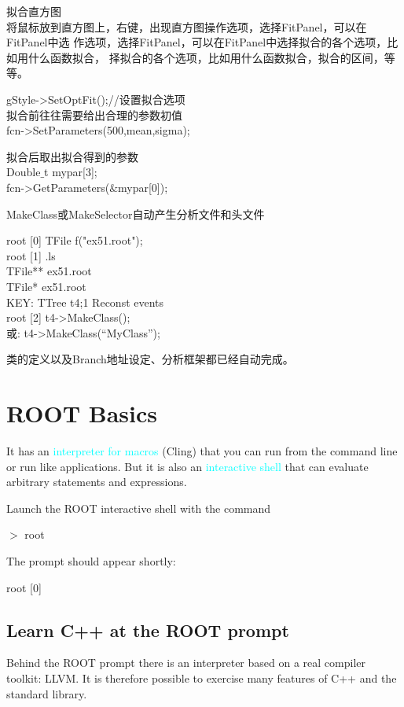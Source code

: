 \documentclass[12pt,a4paper]{article}
\begin{document}
拟合直方图 \\
将鼠标放到直方图上，右键，出现直方图操作选项，选择FitPanel，可以在FitPanel中选 作选项，选择FitPanel，可以在FitPanel中选择拟合的各个选项，比如用什么函数拟合， 择拟合的各个选项，比如用什么函数拟合，拟合的区间，等等。

gStyle->SetOptFit();//设置拟合选项 \\
拟合前往往需要给出合理的参数初值 \\
fcn->SetParameters(500,mean,sigma);

拟合后取出拟合得到的参数 \\
Double$\_$t mypar[3]; \\
fcn->GetParameters($\&$mypar[0]);


MakeClass或MakeSelector自动产生分析文件和头文件

root [0] TFile f("ex51.root"); \\
root [1] .ls \\
TFile** ex51.root \\
TFile*  ex51.root \\
KEY: TTree t4;1 Reconst events \\
root [2] t4->MakeClass(); \\
或: t4->MakeClass(“MyClass”);

类的定义以及Branch地址设定、分析框架都已经自动完成。

\section{ROOT Basics}
It has an \textcolor{cyan}{interpreter for macros} (Cling) that you can run from the command line or run like applications. But it is also an \textcolor{cyan}{interactive shell} that can evaluate arbitrary statements and expressions.

Launch the ROOT interactive shell with the command

$>$ root

The prompt should appear shortly:

root [0]

\subsection{Learn C++ at the ROOT prompt}
Behind the ROOT prompt there is an interpreter based on a real compiler toolkit: LLVM. It is therefore possible to exercise many features of C++ and the standard library.
\end{document}
